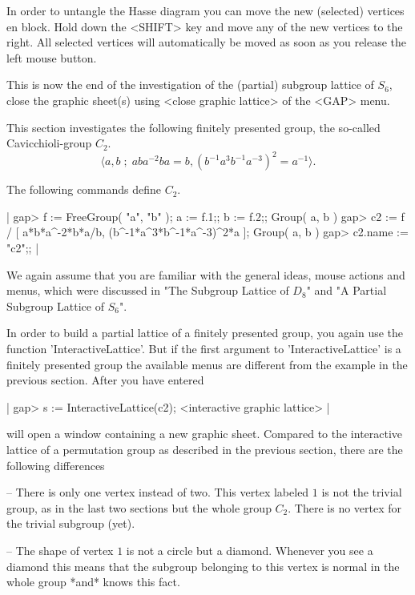 In order  to untangle the Hasse diagram you  can  move the new (selected)
vertices  en block.  Hold down  the <SHIFT> key and   move any of the new
vertices to the right.  All selected vertices will automatically be moved
as soon as you release the left mouse button.

This is  now the  end  of the investigation   of  the (partial)  subgroup
lattice   of  $S_6$, close the    graphic  sheet(s) using  <close graphic
lattice> of the <GAP> menu.


This  section  investigates the  following  finitely presented group, the
so-called Cavicchioli-group $C_2$.
$$
\langle a, b \;;\; aba^{-2}ba=b, (b^{-1}a^3b^{-1}a^{-3})^2=a^{-1}\rangle.
$$

The following {\GAP} commands define $C_2$.

|    gap> f := FreeGroup( "a", "b" );  a := f.1;;  b := f.2;;
    Group( a, b )
    gap> c2 := f / [ a*b*a^-2*b*a/b, (b^-1*a^3*b^-1*a^-3)^2*a ];
    Group( a, b )
    gap> c2.name := "c2";; |

We  again  assume that you are  familiar   with the general  ideas, mouse
actions  and menus,  which were  discussed  in "The  Subgroup Lattice  of
$D_8$" and "A Partial Subgroup Lattice of $S_6$".

In order  to build a  partial lattice of a  finitely presented group, you
again use the function  'InteractiveLattice'.  But if the first  argument
to 'InteractiveLattice' is a finitely presented group the available menus
are different  from the example in  the previous section.  After you have
entered

|    gap> s := InteractiveLattice(c2);
    <interactive graphic lattice> |

{\XGAP} will open a window  containing a new  graphic sheet.  Compared to
the  interactive  lattice of  a permutation   group  as described  in the
previous section, there are the following differences\:

-- There is only one  vertex instead of two.   This vertex labeled $1$ is
not the trivial  group, as in the last  two sections but  the whole group
$C_2$.  There is no vertex for the trivial subgroup (yet).

-- The shape of  vertex $1$ is not a  circle but a diamond.  Whenever you
see a diamond this  means that the subgroup  belonging to this vertex  is
normal in the whole group *and* {\GAP} knows this fact.

